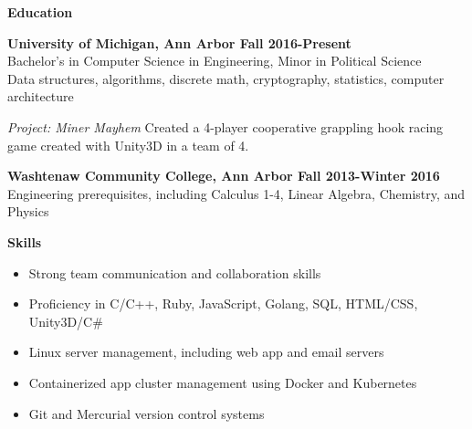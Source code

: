\documentclass[10pt,letter]{article}
\begin{document}
\vspace{0.15in}
{\Large\textbf{Education}}
\vspace{0.15in}

\textbf{University of Michigan, Ann Arbor \hfill  Fall 2016-Present} \\
Bachelor's in Computer Science in Engineering, Minor in Political Science \\
Data structures, algorithms, discrete math, cryptography, statistics, computer architecture

\vspace{0.05in}

\textit{Project: Miner Mayhem} Created a 4-player cooperative grappling hook racing game created with Unity3D in a team of 4.

\vspace{0.25in}

\textbf{Washtenaw Community College, Ann Arbor \hfill  Fall 2013-Winter 2016} \\
Engineering prerequisites, including Calculus 1-4, Linear Algebra, Chemistry, and Physics

\vspace{0.25in}

\vspace{0.15in}
{\Large\textbf{Skills}}

\begin{itemize}
  \item{Strong team communication and collaboration skills}
  \item{Proficiency in C/C++, Ruby, JavaScript, Golang, SQL, HTML/CSS, Unity3D/C\#}
  \item{Linux server management, including web app and email servers}
  \item{Containerized app cluster management using Docker and Kubernetes}
  \item{Git and Mercurial version control systems}
\end{itemize}
\end{document}
